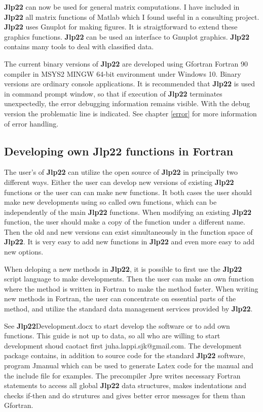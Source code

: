 \textbf{Jlp22} can now be used for general matrix computations. I have included in \textbf{Jlp22} all matrix functions of 
Matlab which I found useful in a consulting project. \textbf{Jlp22} uses Gnuplot for making figures. 
It is straigtforward to extend these graphics functions. \textbf{Jlp22} can be used an 
interface to Gnuplot graphics.  \textbf{Jlp22} contains many tools to deal with classified data. 
 
The current binary versions of \textbf{Jlp22} are developed using Gfortran Fortran 90 compiler in MSYS2 MINGW 64-bit environment 
under Windows 10. 
Binary versions are ordinary console applications. It is recommended that \textbf{Jlp22} is used in command 
prompt window, so that 
if execution of \textbf{Jlp22} terminates unexpectedly, the error debugging information remains visible. 
With the debug version the problematic line is indicated. 
See chapter \ref{error} for more information of error handling. 
 
 
\subsection{Developing own \textbf{Jlp22} functions in Fortran} 
\label{intro2} 
The user's of \textbf{Jlp22} can utilize the open source of \textbf{Jlp22} in principally two different ways. 
Either the user can develop new versions of existing \textbf{Jlp22} functions or the user can can make new functions. 
It both cases the user should make new developments using so called own functions, which can 
be independently of the main \textbf{Jlp22} functions. When modifying an existing \textbf{Jlp22} function, the user should make a copy of the 
function under a different name. Then the old and new versions 
can exist simultaneously in the function 
space of \textbf{Jlp22}. It is very easy to add new functions in \textbf{Jlp22} and even more easy to add new options. 
 
When deloping a new methods in \textbf{Jlp22}, it is possible to first use the \textbf{Jlp22} 
script language to make developments. 
Then the user can make an own function where the method is written in Fortran to make the method faster. 
When writing new methods in Fortran, the user can concentrate on essential parts of the method, and utilize 
the standard data management services provided by \textbf{Jlp22}. 
 
 
See \textbf{Jlp22}Development.docx to start develop the software or to add 
own functions. This guide is not up to data, so all who are willing to start development shoud 
caotact first juha.lappi.sjk@gmail.com. The development package contains, in addition to source code for 
the standard \textbf{Jlp22} software, program Jmanual 
which can be used to generate Latex code for the manual and the include file for 
examples.   The precompiler Jpre  writes necessary Fortran statements to access all global 
\textbf{Jlp22} data structures, makes indentations and checks if-then and do strutures and gives 
better error messages for them than Gfortran. 
